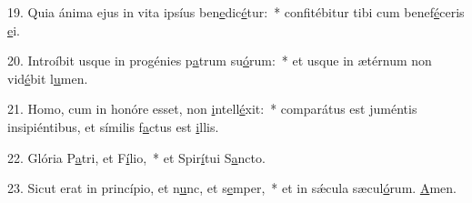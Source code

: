 19. Quia ánima ejus in vita ipsíus ben\uline{e}dic\uline{é}tur:~* confitébitur tibi cum benef\uline{é}ceris \uline{e}i.\par 
20. Introíbit usque in progénies p\uline{a}trum su\uline{ó}rum:~* et usque in ætérnum non vid\uline{é}bit l\uline{u}men.\par 
21. Homo, cum in honóre esset, non \uline{i}ntell\uline{é}xit:~* comparátus est juméntis insipiéntibus, et símilis f\uline{a}ctus est \uline{i}llis.\par 
22. Glória P\uline{a}tri, et F\uline{í}lio,~* et Spir\uline{í}tui S\uline{a}ncto.\par 
23. Sicut erat in princípio, et n\uline{u}nc, et s\uline{e}mper,~* et in sǽcula sæcul\uline{ó}rum. \uline{A}men.\par 
